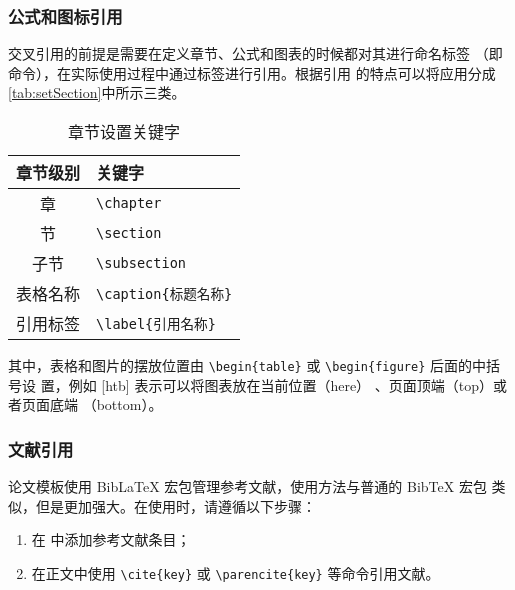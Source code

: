 \subsubsection{公式和图标引用}

交叉引用的前提是需要在定义章节、公式和图表的时候都对其进行命名标签
（即\label{sec:labelName} 命令），在实际使用过程中通过标签进行引用。根据引用
的特点可以将应用分成\autoref{tab:setSection}中所示三类。

\begin{table}[htb]
 \centering
  \caption{章节设置关键字}     %
  \label{tab:setSection}    %
  \begin{tabular}{cl}
    \hline
    章节级别        & 关键字     \\
    \hline
     章        & \verb|\chapter| \\
     节        & \verb|\section | \\
    子节      & \verb|\subsection |\\
    表格名称       & \verb|\caption{标题名称}| \\
    引用标签       & \verb|\label{引用名称}| \\
    \hline
  \end{tabular}
\end{table}


其中，表格和图片的摆放位置由 \verb|\begin{table}| 或 \verb|\begin{figure}| 后面的中括号设
置，例如 [htb] 表示可以将图表放在当前位置（here）
、页面顶端（top）或者页面底端
（bottom）。

\subsubsection{文献引用}

\BIThesis 论文模板使用 BibLaTeX 宏包管理参考文献，使用方法与普通的 BibTeX 宏包
类似，但是更加强大。在使用时，请遵循以下步骤：
\begin{enumerate}
  \item 在 \texttt{} 中添加参考文献条目；
  \item 在正文中使用 \verb|\cite{key}| 或 \verb|\parencite{key}| 等命令引用文献。
\end{enumerate}

